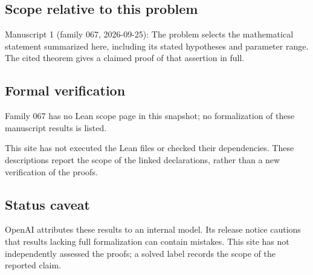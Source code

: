 \documentclass[11pt]{article}
\begin{document}
\subsection{Scope relative to this problem}
Manuscript 1 (family 067, 2026-09-25): The problem selects the mathematical statement summarized here, including its stated hypotheses and parameter range. The cited theorem gives a claimed proof of that assertion in full.

\subsection{Formal verification}
Family 067 has no Lean scope page in this snapshot; no formalization of these manuscript results is listed.

This site has not executed the Lean files or checked their dependencies. These descriptions report the scope of the linked declarations, rather than a new verification of the proofs.

\subsection{Status caveat}
OpenAI attributes these results to an internal model. Its release notice cautions that results lacking full formalization can contain mistakes. This site has not independently assessed the proofs; a solved label records the scope of the reported claim.
\end{document}
